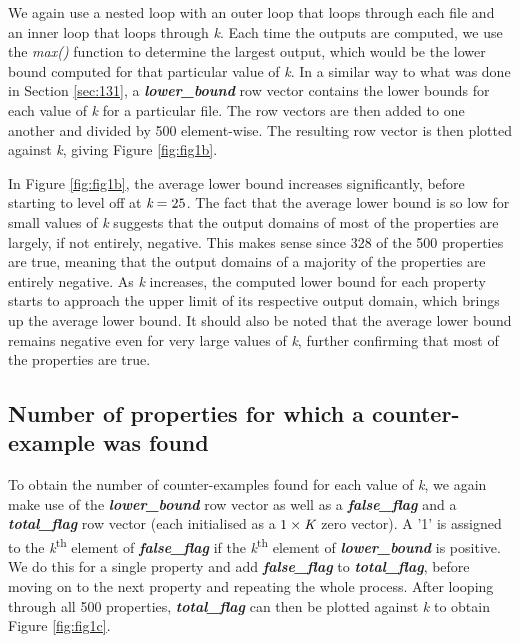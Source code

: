 \documentclass[11pt]{article}
\begin{document}
We again use a nested loop with an outer loop that loops through each file and an inner loop that loops through \emph{k}. Each time the outputs are computed, we use the \emph{max()} function to determine the largest output, which would be the lower bound computed for that particular value of \emph{k}. In a similar way to what was done in Section \ref{sec:131}, a \emph{\textbf{lower\_bound}} row vector contains the lower bounds for each value of \emph{k} for a particular file. The row vectors are then added to one another and divided by 500 element-wise. The resulting row vector is then plotted against \emph{k}, giving Figure \ref{fig:fig1b}.



In Figure \ref{fig:fig1b}, the average lower bound increases significantly, before starting to level off at $\emph{k}=25$. The fact that the average lower bound is so low for small values of \emph{k} suggests that the output domains of most of the properties are largely, if not entirely, negative. This makes sense since 328 of the 500 properties are true, meaning that the output domains of a majority of the properties are entirely negative. As \emph{k} increases, the computed lower bound for each property starts to approach the upper limit of its respective output domain, which brings up the average lower bound. It should also be noted that the average lower bound remains negative even for very large values of \emph{k}, further confirming that most of the properties are true.

\subsection{Number of properties for which a counter-example was found}
\label{sec:1.3}

To obtain the number of counter-examples found for each value of \emph{k}, we again make use of the \emph{\textbf{lower\_bound}} row vector as well as a \emph{\textbf{false\_flag}} and a \emph{\textbf{total\_flag}} row vector (each initialised as a $1\times\emph{K}$ zero vector). A '1' is assigned to the \emph{k}\textsuperscript{th} element of \emph{\textbf{false\_flag}} if the \emph{k}\textsuperscript{th} element of \emph{\textbf{lower\_bound}} is positive. We do this for a single property and add \emph{\textbf{false\_flag}} to \emph{\textbf{total\_flag}}, before moving on to the next property and repeating the whole process. After looping through all 500 properties, \emph{\textbf{total\_flag}} can then be plotted against \emph{k} to obtain Figure \ref{fig:fig1c}. 
\end{document}
